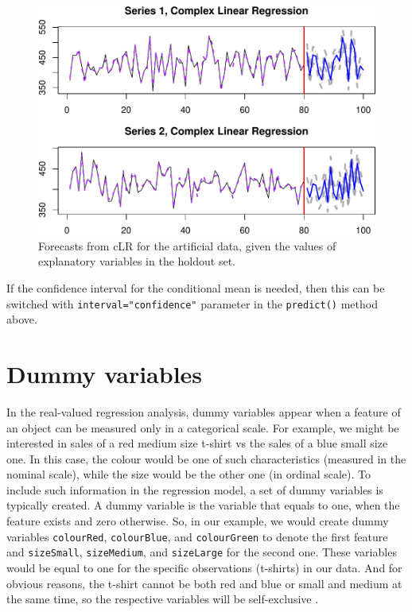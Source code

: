 \documentclass[
]{book}
\begin{document}
\begin{figure}
\centering
\includegraphics{Svetunkov---Svetunkov---Complex-Valued-Econometrics_files/figure-latex/CLRArtificialForecast-1.pdf}
\caption{\label{fig:CLRArtificialForecast}Forecasts from cLR for the artificial data, given the values of explanatory variables in the holdout set.}
\end{figure}

If the confidence interval for the conditional mean is needed, then this can be switched with \texttt{interval="confidence"} parameter in the \texttt{predict()} method above.

\hypertarget{multipleCLRDummy}{%
\section{Dummy variables}\label{multipleCLRDummy}}

In the real-valued regression analysis, dummy variables appear when a feature of an object can be measured only in a categorical scale. For example, we might be interested in sales of a red medium size t-shirt vs the sales of a blue small size one. In this case, the colour would be one of such characteristics (measured in the nominal scale), while the size would be the other one (in ordinal scale). To include such information in the regression model, a set of dummy variables is typically created. A dummy variable is the variable that equals to one, when the feature exists and zero otherwise. So, in our example, we would create dummy variables \texttt{colourRed}, \texttt{colourBlue}, and \texttt{colourGreen} to denote the first feature and \texttt{sizeSmall}, \texttt{sizeMedium}, and \texttt{sizeLarge} for the second one. These variables would be equal to one for the specific observations (t-shirts) in our data. And for obvious reasons, the t-shirt cannot be both red and blue or small and medium at the same time, so the respective variables will be self-exclusive \citep[ provides more information about this]{SvetunkovSBA}.
\end{document}
